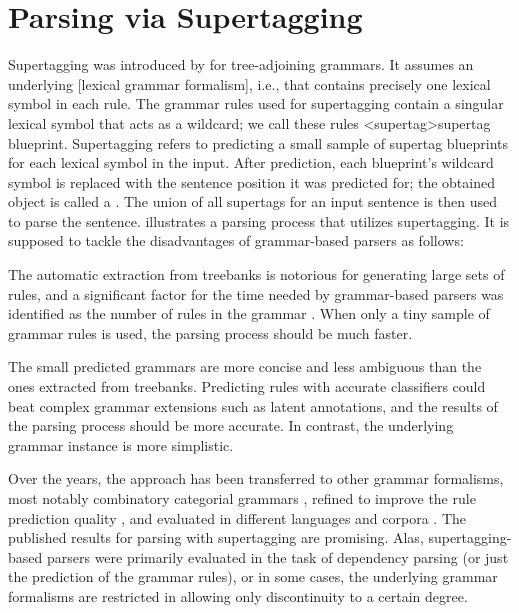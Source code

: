 \documentclass[../document.tex]{subfiles}
\begin{document}
    \section*{Parsing via Supertagging}
    Supertagging was introduced by \citet{bangalore1999supertagging} for tree-adjoining grammars.
    It assumes an underlying [lexical grammar formalism], i.e., that contains precisely one lexical symbol in each rule.
    The grammar rules used for supertagging contain a singular lexical symbol that acts as a wildcard; we call these rules <supertag>{supertag blueprint}.
    Supertagging refers to predicting a small sample of supertag blueprints for each lexical symbol in the input.
    After prediction, each blueprint's wildcard symbol is replaced with the sentence position it was predicted for; the obtained object is called a .
    The union of all supertags for an input sentence is then used to parse the sentence.
     illustrates a parsing process that utilizes supertagging.
    It is supposed to tackle the disadvantages of grammar-based parsers as follows:
    \begin{compactitem}
        \item The automatic extraction from treebanks is notorious for generating large sets of rules, and a significant factor for the time needed by grammar-based parsers was identified as the number of rules in the grammar \citep{dunlop2010reducing}.
            When only a tiny sample of grammar rules is used, the parsing process should be much faster.
        \item The small predicted grammars are more concise and less ambiguous than the ones extracted from treebanks.
            Predicting rules with accurate classifiers could beat complex grammar extensions such as latent annotations, and the results of the parsing process should be more accurate. In contrast, the underlying grammar instance is more simplistic.
    \end{compactitem}
    Over the years, the approach has been transferred to other grammar formalisms, most notably combinatory categorial grammars \citep{Clark04}, refined to improve the rule prediction quality \citep{vaswani2016supertagging,Kad18,tian20}, and evaluated in different languages and corpora \citep{Bla18}.
    The published results for parsing with supertagging are promising.
    Alas, supertagging-based parsers were primarily evaluated in the task of dependency parsing (or just the prediction of the grammar rules), or in some cases, the underlying grammar formalisms are restricted in allowing only discontinuity to a certain degree.
\end{document}
